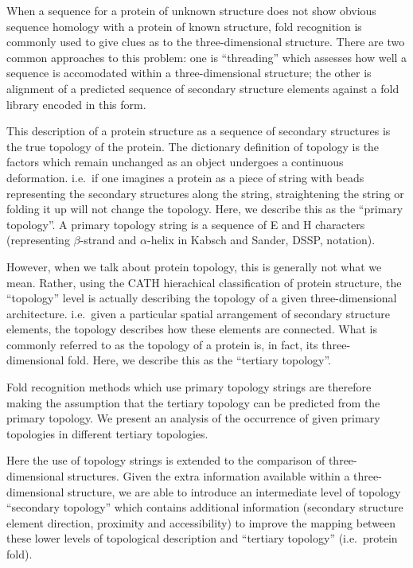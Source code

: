 \documentclass{article}
\begin{document}
When a sequence for a protein of unknown structure does not show
obvious sequence homology with a protein of known structure, fold
recognition is commonly used to give clues as to the three-dimensional
structure. There are two common approaches to this problem: one is
``threading'' which assesses how well a sequence is accomodated within
a three-dimensional structure; the other is alignment of a predicted
sequence of secondary structure elements against a fold library
encoded in this form.

This description of a protein structure as a sequence of secondary
structures is the true topology of the protein. The dictionary
definition of topology is the factors which remain unchanged as an
object undergoes a continuous deformation. i.e.\ if one imagines a
protein as a piece of string with beads representing the secondary
structures along the string, straightening the string or folding it up
will not change the topology. Here, we describe this as the ``primary
topology''. A primary topology string is a sequence of E and H
characters (representing $\beta$-strand and $\alpha$-helix in Kabsch
and Sander, DSSP, notation).

However, when we talk about protein topology, this is generally not
what we mean. Rather, using the CATH hierachical classification of
protein structure, the ``topology'' level is actually describing the
topology of a given three-dimensional architecture. i.e.\ given a
particular spatial arrangement of secondary structure elements, the
topology describes how these elements are connected. What is commonly
referred to as the topology of a protein is, in fact, its
three-dimensional fold. Here, we describe this as the ``tertiary
topology''. 

Fold recognition methods which use primary topology strings are
therefore making the assumption that the tertiary topology can be
predicted from the primary topology. We present an analysis of the
occurrence of given primary topologies in different tertiary
topologies. 

Here the use of topology strings is extended to the comparison
of three-dimensional structures. Given the extra information available
within a three-dimensional structure, we are able to introduce an
intermediate level of topology ``secondary topology'' which contains
additional information (secondary structure element direction,
proximity and accessibility) to improve the mapping between these
lower levels of topological description and ``tertiary topology''
(i.e.\ protein fold).
\end{document}
